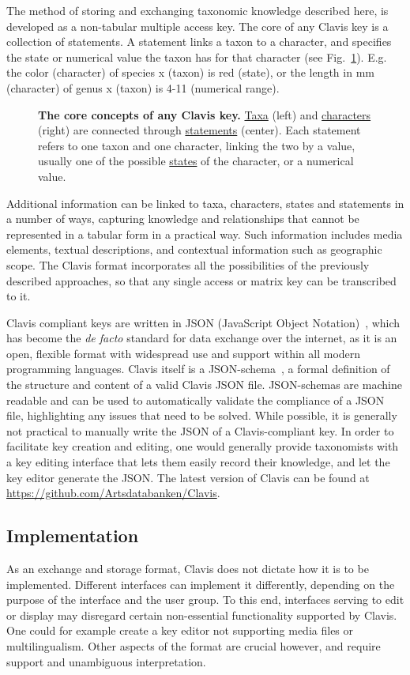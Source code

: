 \documentclass[10pt,letterpaper]{article}
\begin{document}
The method of storing and exchanging taxonomic knowledge described here, is developed as a non-tabular multiple access key. The core of any Clavis key is a collection of statements. A statement links a taxon to a character, and specifies the state or numerical value the taxon has for that character (see Fig.~\ref{fig1}). E.g. the color (character) of species x (taxon) is red (state), or the length in mm (character) of genus x (taxon) is 4-11 (numerical range).




\begin{figure}[!h]
  \caption{{\bf The core concepts of any Clavis key.}
  \underline{Taxa} (left) and \underline{characters} (right) are connected through \underline{statements} (center). Each statement refers to one taxon and one character, linking the two by a value, usually one of the possible \underline{states} of the character, or a numerical value.}
  \label{fig1}
\end{figure}

Additional information can be linked to taxa, characters, states and statements in a number of ways, capturing knowledge and relationships that cannot be represented in a tabular form in a practical way. Such information includes media elements, textual descriptions, and contextual information such as geographic scope. The Clavis format incorporates all the possibilities of the previously described approaches, so that any single access or matrix key can be transcribed to it.

Clavis compliant keys are written in JSON (JavaScript Object Notation)~\cite{JSON}, which has become the \textit{de facto} standard for data exchange over the internet, as it is an open, flexible format with widespread use and support within all modern programming languages. Clavis itself is a JSON-schema~\cite{JSON_schema}, a formal definition of the structure and content of a valid Clavis JSON file. JSON-schemas are machine readable and can be used to automatically validate the compliance of a JSON file, highlighting any issues that need to be solved. While possible, it is generally not practical to manually write the JSON of a Clavis-compliant key. In order to facilitate key creation and editing, one would generally provide taxonomists with a key editing interface that lets them easily record their knowledge, and let the key editor generate the JSON. The latest version of Clavis can be found at \url{https://github.com/Artsdatabanken/Clavis}.

\subsection*{
Implementation
}
As an exchange and storage format, Clavis does not dictate how it is to be implemented. Different interfaces can implement it differently, depending on the purpose of the interface and the user group. To this end, interfaces serving to edit or display may disregard certain non-essential functionality supported by Clavis. One could for example create a key editor not supporting media files or multilingualism. Other aspects of the format are crucial however, and require support and unambiguous interpretation.
\end{document}
